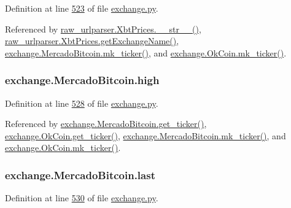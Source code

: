 Definition at line \hyperlink{exchange_8py_source_l00523}{523} of file \hyperlink{exchange_8py_source}{exchange.\+py}.



Referenced by \hyperlink{raw__urlparser_8py_source_l00074}{raw\+\_\+urlparser.\+Xbt\+Prices.\+\_\+\+\_\+str\+\_\+\+\_\+()}, \hyperlink{raw__urlparser_8py_source_l00068}{raw\+\_\+urlparser.\+Xbt\+Prices.\+get\+Exchange\+Name()}, \hyperlink{exchange_8py_source_l00549}{exchange.\+Mercado\+Bitcoin.\+mk\+\_\+ticker()}, and \hyperlink{exchange_8py_source_l00614}{exchange.\+Ok\+Coin.\+mk\+\_\+ticker()}.

\subsubsection[{\texorpdfstring{high}{high}}]{\setlength{\rightskip}{0pt plus 5cm}exchange.\+Mercado\+Bitcoin.\+high}\hypertarget{classexchange_1_1_mercado_bitcoin_a0b9c2d465601a48e3b8838354e931c39}{}\label{classexchange_1_1_mercado_bitcoin_a0b9c2d465601a48e3b8838354e931c39}


Definition at line \hyperlink{exchange_8py_source_l00528}{528} of file \hyperlink{exchange_8py_source}{exchange.\+py}.



Referenced by \hyperlink{exchange_8py_source_l00535}{exchange.\+Mercado\+Bitcoin.\+get\+\_\+ticker()}, \hyperlink{exchange_8py_source_l00600}{exchange.\+Ok\+Coin.\+get\+\_\+ticker()}, \hyperlink{exchange_8py_source_l00549}{exchange.\+Mercado\+Bitcoin.\+mk\+\_\+ticker()}, and \hyperlink{exchange_8py_source_l00614}{exchange.\+Ok\+Coin.\+mk\+\_\+ticker()}.

\subsubsection[{\texorpdfstring{last}{last}}]{\setlength{\rightskip}{0pt plus 5cm}exchange.\+Mercado\+Bitcoin.\+last}\hypertarget{classexchange_1_1_mercado_bitcoin_a5f2759cd17d5dd36bc813c815543f3cc}{}\label{classexchange_1_1_mercado_bitcoin_a5f2759cd17d5dd36bc813c815543f3cc}


Definition at line \hyperlink{exchange_8py_source_l00530}{530} of file \hyperlink{exchange_8py_source}{exchange.\+py}.



